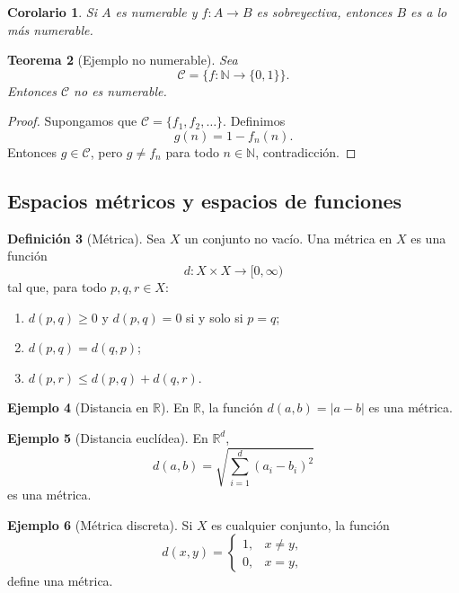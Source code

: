 \documentclass[12pt]{article}
\theoremstyle{definition}
\newtheorem{definition}{Definición}[section]
\newtheorem{example}[definition]{Ejemplo}
\theoremstyle{plain}
\newtheorem{theorem}[definition]{Teorema}
\newtheorem{corollary}[definition]{Corolario}
\theoremstyle{remark}
\begin{document}
\begin{corollary}
Si $A$ es numerable y $f\colon A\to B$ es sobreyectiva, entonces $B$ es a lo más numerable.
\end{corollary}

\begin{theorem}[Ejemplo no numerable]
Sea
\[
\mathcal C=\{f\colon\mathbb N\to\{0,1\}\}.
\]
Entonces $\mathcal C$ no es numerable.
\end{theorem}

\begin{proof}
Supongamos que $\mathcal C=\{f_1,f_2,\dots\}$.
Definimos
\[
g(n)=1-f_n(n).
\]
Entonces $g\in\mathcal C$, pero $g\neq f_n$ para todo $n\in\mathbb N$, contradicción.
\end{proof}

\subsection*{Espacios métricos y espacios de funciones}

\begin{definition}[Métrica]
Sea $X$ un conjunto no vacío.
Una métrica en $X$ es una función
\[
d\colon X\times X\to [0,\infty)
\]
tal que, para todo $p,q,r\in X$:
\begin{enumerate}[label=\roman*)]
    \item $d(p,q)\ge0$ y $d(p,q)=0$ si y solo si $p=q$;
    \item $d(p,q)=d(q,p)$;
    \item $d(p,r)\le d(p,q)+d(q,r)$.
\end{enumerate}
\end{definition}

\begin{example}[Distancia en $\mathbb R$]
En $\mathbb R$, la función $d(a,b)=|a-b|$ es una métrica.
\end{example}

\begin{example}[Distancia euclídea]
En $\mathbb R^d$,
\[
d(a,b)=\sqrt{\sum_{i=1}^d(a_i-b_i)^2}
\]
es una métrica.
\end{example}

\begin{example}[Métrica discreta]
Si $X$ es cualquier conjunto, la función
\[
d(x,y)=
\begin{cases}
1,& x\neq y,\\
0,& x=y,
\end{cases}
\]
define una métrica.
\end{example}
\end{document}

